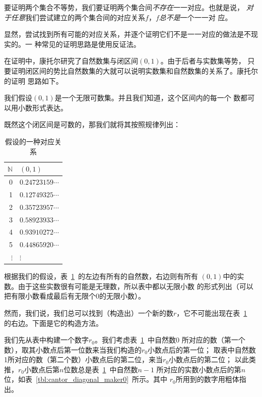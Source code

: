 要证明两个集合不等势，我们要证明两个集合间\emph{不存在}一一对应。也就是说，
\emph{对于任意}我们尝试建立的两个集合间的对应关系$f$，$f$\emph{总不是}一个一一对
应。

显然，尝试找到所有可能的对应关系，并逐个证明它们不是一一对应的做法是不现实的。一
种常见的证明思路是使用反证法。%

在证明中，康托尔研究了自然数集与闭区间$\left( 0,1\right) $。由于后者与实数集等势，
只要证明闭区间的势比自然数集的大就可以说明实数集和自然数集的关系了。康托尔的证明
思路如下。

我们假设$\left( 0,1 \right) $是一个无限可数集。并且我们知道，这个区间内的每一个
数都可以用小数形式表达。

既然这个闭区间是可数的，那我们就将其按照规律列出：

\begin{table}[h]
    \centering
    \caption{假设的一种对应关系}\label{tbl:cantor_diagonal}
    \begin{tabular}{r|l}
        $\mathbb{N}$& $\left( 0,1 \right) $\\
        \hline
        0 & $0.24723159\cdots $\\
        1 & $0.12749325\cdots $\\
        2 & $0.35723957\cdots $\\
        3 & $0.58923933\cdots $\\
        4 & $0.93910272\cdots $\\
        5 & $0.44865920\cdots $\\
        $\vdots$ & $\vdots$
    \end{tabular}
\end{table}

根据我们的假设，表~\ref{tbl:cantor_diagonal}~的左边有所有的自然数，右边则有所有
$\left( 0,1 \right) $中的实数。由于这些实数很有可能是无理数，所以表中都以无限小数
的形式列出（可以把有限小数看成最后有无限个0的无限小数）。

然而，我们说，我们总可以找到（构造出）一个新的数$r$，它不可能出现在表~\ref{tbl:cantor_diagonal}~%
的右边。下面是它的构造方法。

我们先从表中构建一个数字$r_{0}$。我们考虑表~\ref{tbl:cantor_diagonal}~中自然数0
所对应的数（第一个数），取其小数点后第一位数来当我们构造的$r_{0}$小数点后的第一位；
取表中自然数1所对应的数（第二个数）小数点后的第二位，来当$r_{0}$小数点后的第二位；
以此类推，$r_{0}$小数点后第$n$位数总是表~\ref{tbl:cantor_diagonal}~中自然数$n-1$
所对应的实数小数点后的第$n$位，如表~\ref{tbl:cantor_diagonal_maker0}~所示。其中
$r_{0}$所用到的数字用粗体指出。

